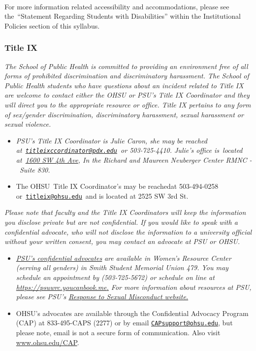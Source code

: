 \documentclass[
  letterpaper,
  DIV=11,
  numbers=noendperiod]{scrartcl}
\providecommand{\tightlist}{%
  \setlength{\itemsep}{0pt}\setlength{\parskip}{0pt}}\usepackage{longtable,booktabs,array}
\begin{document}
~

For more information related accessibility and accommodations, please
see the~``Statement Regarding Students with Disabilities'' within the
Institutional Policies section of this syllabus.

\subsubsection{Title IX}\label{title-ix}

\emph{The School of Public Health is committed to providing an
environment free of all forms of prohibited discrimination and
discriminatory harassment. The School of Public Health students who have
questions about an incident related to Title IX are welcome to contact
either the OHSU or PSU's Title IX Coordinator and they will direct you
to the appropriate resource or office. Title IX pertains to any form of
sex/gender discrimination, discriminatory harassment, sexual harassment
or sexual violence.}

\begin{itemize}
\item
  \emph{PSU's Title IX Coordinator is Julie Caron, she may be reached
  at~\href{mailto:titleixccordinator@pdx.edu}{\nolinkurl{titleixccordinator@pdx.edu}}~or
  503-725-4410. Julie's office is~located
  at~\href{https://www.google.com/maps/search/1600+SW+4th+Ave?entry=gmail&source=g}{1600
  SW 4th Ave}, In the Richard and Maureen Neuberger Center RMNC -~Suite
  830.}
\item
  The OHSU~Title IX Coordinator's may be reachedat 503-494-0258
  or~\href{mailto:titleix@ohsu.edu}{\nolinkurl{titleix@ohsu.edu}}~and is
  located at 2525 SW 3rd St.
\end{itemize}

\emph{Please note that faculty and the Title IX Coordinators will keep
the information you disclose private but are not confidential. If you
would like to speak with a confidential advocate, who will not disclose
the information to a university official without your written consent,
you may contact an advocate at PSU or OHSU.}

\begin{itemize}
\tightlist
\item
  \href{https://www.pdx.edu/womens-resource-center/schedule-confidential-advocacy-appointment}{\emph{PSU's
  confidential advocates}} \emph{are available in Women's Resource
  Center (serving all genders) in Smith Student Memorial Union 479. You
  may schedule an appointment by (503-725-5672) or schedule on line at
  \href{https://psuwrc.youcanbook.me/}{https://psuwrc.youcanbook.me}\ul{.}
  For more information about resources at PSU, please see PSU's
  \href{https://www.pdx.edu/sexual-assault/}{Response to Sexual
  Misconduct website.}}
\item
  OHSU's advocates are available through the Confidential Advocacy
  Program (CAP) at 833-495-CAPS (2277) or by email
  \href{mailto:CAPsupport@ohsu.edu}{\nolinkurl{CAPsupport@ohsu.edu}},
  but please note, email is not a secure form of communication. Also
  visit \href{http://www.ohsu.edu/CAP}{www.ohsu.edu/CAP}.
\end{itemize}
\end{document}
